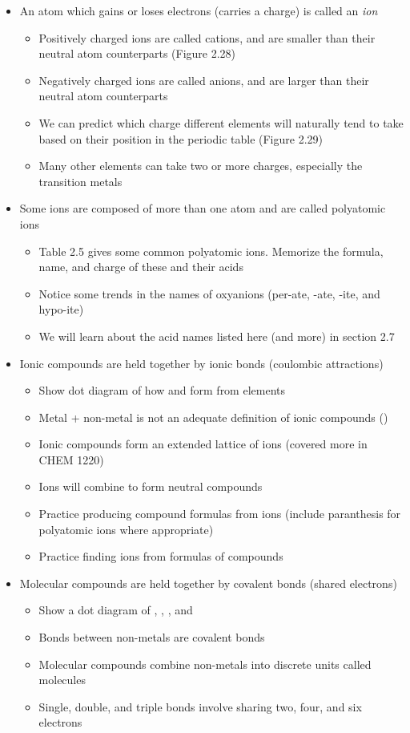 \documentclass[12pt, openany, letterpaper]{memoir}
\begin{document}
\begin{itemize}
  \item An atom which gains or loses electrons (carries a charge) is called an \emph{ion}
  \begin{itemize}
    \item Positively charged ions are called cations, and are smaller than their neutral atom counterparts (Figure 2.28)
    \item Negatively charged ions are called anions, and are larger than their neutral atom counterparts
    \item We can predict which charge different elements will naturally tend to take based on their position in the periodic table (Figure 2.29)
    \item Many other elements can take two or more charges, especially the transition metals
  \end{itemize}
  \item Some ions are composed of more than one atom and are called polyatomic ions
  \begin{itemize}
    \item Table 2.5 gives some common polyatomic ions. Memorize the formula, name, and charge of these and their acids
    \item Notice some trends in the names of oxyanions (per-ate, -ate, -ite, and hypo-ite)
    \item We will learn about the acid names listed here (and more) in section 2.7
  \end{itemize}
  \item Ionic compounds are held together by ionic bonds (coulombic attractions)
  \begin{itemize}
    \item Show dot diagram of how  and  form from elements
    \item Metal + non-metal is not an adequate definition of ionic compounds ()
    \item Ionic compounds form an extended lattice of ions (covered more in CHEM 1220)
    \item Ions will combine to form neutral compounds
    \item Practice producing compound formulas from ions (include paranthesis for polyatomic ions where appropriate)
    \item Practice finding ions from formulas of compounds
  \end{itemize}
  \item Molecular compounds are held together by covalent bonds (shared electrons)
  \begin{itemize}
    \item Show a dot diagram of , , , and 
    \item Bonds between non-metals are covalent bonds
    \item Molecular compounds combine non-metals into discrete units called molecules
    \item Single, double, and triple bonds involve sharing two, four, and six electrons
  \end{itemize}
\end{itemize}
\end{document}
